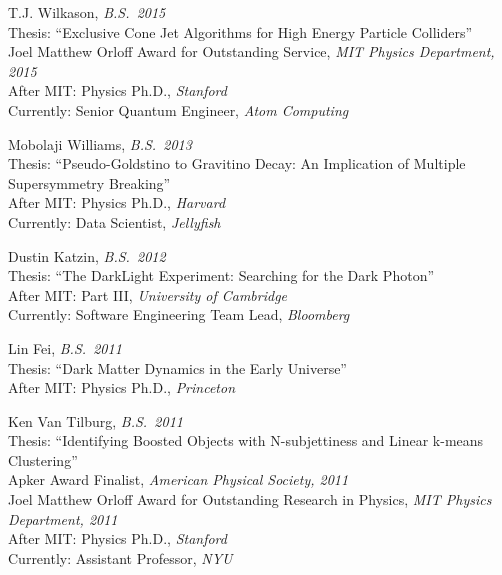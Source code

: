 \item T.J. Wilkason, \emph{B.S.~2015}
\\ Thesis: ``Exclusive Cone Jet Algorithms for High Energy Particle Colliders''
\\ Joel Matthew Orloff Award for Outstanding Service, \emph{MIT Physics Department, 2015}
\\ After MIT: Physics Ph.D., \emph{Stanford}
\\ Currently: Senior Quantum Engineer, \emph{Atom Computing}

\item Mobolaji Williams, \emph{B.S.~2013}
\\ Thesis: ``Pseudo-Goldstino to Gravitino Decay: An Implication of Multiple Supersymmetry Breaking''
\\ After MIT: Physics Ph.D., \emph{Harvard}
\\ Currently: Data Scientist, \emph{Jellyfish}

\item Dustin Katzin, \emph{B.S.~2012}
\\ Thesis: ``The DarkLight Experiment: Searching for the Dark Photon''
\\ After MIT: Part III, \emph{University of Cambridge}
\\ Currently: Software Engineering Team Lead, \emph{Bloomberg}

\item Lin Fei, \emph{B.S.~2011}
\\ Thesis: ``Dark Matter Dynamics in the Early Universe''
\\ After MIT: Physics Ph.D., \emph{Princeton}

\item Ken Van Tilburg, \emph{B.S.~2011}
\\ Thesis: ``Identifying Boosted Objects with N-subjettiness and Linear k-means Clustering''
\\ Apker Award Finalist, \emph{American Physical Society, 2011}
\\ Joel Matthew Orloff Award for Outstanding Research in Physics, \emph{MIT Physics Department, 2011}
\\ After MIT: Physics Ph.D., \emph{Stanford}
\\ Currently: Assistant Professor, \emph{NYU}

\el
